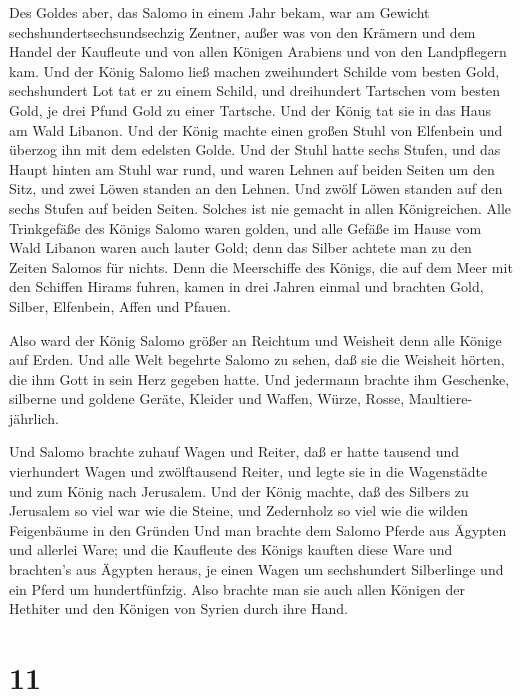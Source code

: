  Des Goldes aber, das Salomo in einem Jahr bekam, war am
Gewicht sechshundertsechsundsechzig Zentner,  außer was von
den Krämern und dem Handel der Kaufleute und von allen Königen Arabiens
und von den Landpflegern kam.  Und der König Salomo ließ
machen zweihundert Schilde vom besten Gold, sechshundert Lot tat er zu
einem Schild,  und dreihundert Tartschen vom besten Gold,
je drei Pfund Gold zu einer Tartsche. Und der König tat sie in das Haus
am Wald Libanon.  Und der König machte einen großen Stuhl
von Elfenbein und überzog ihn mit dem edelsten Golde.  Und
der Stuhl hatte sechs Stufen, und das Haupt hinten am Stuhl war rund,
und waren Lehnen auf beiden Seiten um den Sitz, und zwei Löwen standen
an den Lehnen.  Und zwölf Löwen standen auf den sechs
Stufen auf beiden Seiten. Solches ist nie gemacht in allen Königreichen.
 Alle Trinkgefäße des Königs Salomo waren golden, und alle
Gefäße im Hause vom Wald Libanon waren auch lauter Gold; denn das Silber
achtete man zu den Zeiten Salomos für nichts.  Denn die
Meerschiffe des Königs, die auf dem Meer mit den Schiffen Hirams fuhren,
kamen in drei Jahren einmal und brachten Gold, Silber, Elfenbein, Affen
und Pfauen.

 Also ward der König Salomo größer an Reichtum und Weisheit
denn alle Könige auf Erden.  Und alle Welt begehrte Salomo
zu sehen, daß sie die Weisheit hörten, die ihm Gott in sein Herz gegeben
hatte.  Und jedermann brachte ihm Geschenke, silberne und
goldene Geräte, Kleider und Waffen, Würze, Rosse, Maultiere-jährlich.

 Und Salomo brachte zuhauf Wagen und Reiter, daß er hatte
tausend und vierhundert Wagen und zwölftausend Reiter, und legte sie in
die Wagenstädte und zum König nach Jerusalem.  Und der
König machte, daß des Silbers zu Jerusalem so viel war wie die Steine,
und Zedernholz so viel wie die wilden Feigenbäume in den Gründen
 Und man brachte dem Salomo Pferde aus Ägypten und allerlei
Ware; und die Kaufleute des Königs kauften diese Ware  und
brachten's aus Ägypten heraus, je einen Wagen um sechshundert
Silberlinge und ein Pferd um hundertfünfzig. Also brachte man sie auch
allen Königen der Hethiter und den Königen von Syrien durch ihre Hand.

\hypertarget{section-10}{%
\section{11}\label{section-10}}

